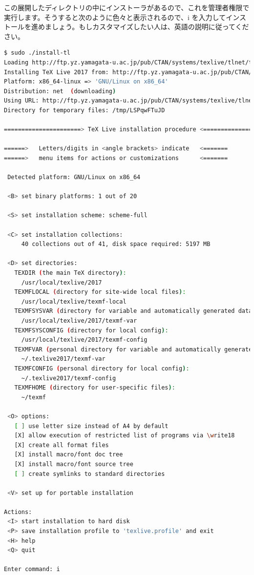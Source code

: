 この展開したディレクトリの中にインストーラがあるので、これを管理者権限で実行します。そうすると次のように色々と表示されるので、i を入力してインストールを進めましょう。もしカスタマイズしたい人は、英語の説明に従ってください。

\begin{lstlisting}[language=bash]
$ sudo ./install-tl
Loading http://ftp.yz.yamagata-u.ac.jp/pub/CTAN/systems/texlive/tlnet/tlpkg/texlive.tlpdb
Installing TeX Live 2017 from: http://ftp.yz.yamagata-u.ac.jp/pub/CTAN/systems/texlive/tlnet (verified)
Platform: x86_64-linux => 'GNU/Linux on x86_64'
Distribution: net  (downloading)
Using URL: http://ftp.yz.yamagata-u.ac.jp/pub/CTAN/systems/texlive/tlnet
Directory for temporary files: /tmp/LSPqwFTuJD

======================> TeX Live installation procedure <=====================

======>   Letters/digits in <angle brackets> indicate   <=======
======>   menu items for actions or customizations      <=======

 Detected platform: GNU/Linux on x86_64
 
 <B> set binary platforms: 1 out of 20

 <S> set installation scheme: scheme-full

 <C> set installation collections:
     40 collections out of 41, disk space required: 5197 MB

 <D> set directories:
   TEXDIR (the main TeX directory):
     /usr/local/texlive/2017
   TEXMFLOCAL (directory for site-wide local files):
     /usr/local/texlive/texmf-local
   TEXMFSYSVAR (directory for variable and automatically generated data):
     /usr/local/texlive/2017/texmf-var
   TEXMFSYSCONFIG (directory for local config):
     /usr/local/texlive/2017/texmf-config
   TEXMFVAR (personal directory for variable and automatically generated data):
     ~/.texlive2017/texmf-var
   TEXMFCONFIG (personal directory for local config):
     ~/.texlive2017/texmf-config
   TEXMFHOME (directory for user-specific files):
     ~/texmf

 <O> options:
   [ ] use letter size instead of A4 by default
   [X] allow execution of restricted list of programs via \write18
   [X] create all format files
   [X] install macro/font doc tree
   [X] install macro/font source tree
   [ ] create symlinks to standard directories

 <V> set up for portable installation

Actions:
 <I> start installation to hard disk
 <P> save installation profile to 'texlive.profile' and exit
 <H> help
 <Q> quit

Enter command: i
\end{lstlisting}


